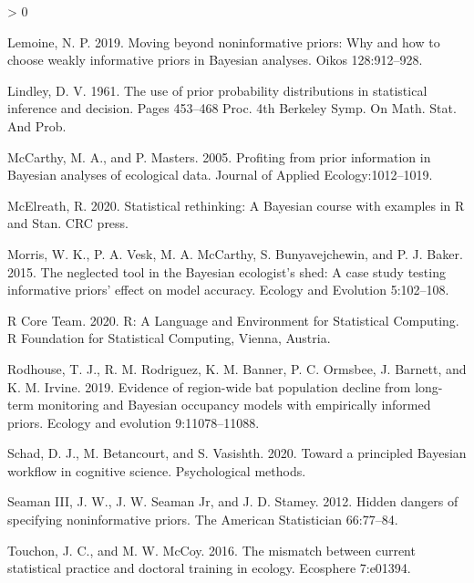 \documentclass[
  12pt,
]{article}
\newlength{\cslhangindent}
\newenvironment{CSLReferences}[2] %
 {%
  \setlength{\parindent}{0pt}
  \ifodd #1 \everypar{\setlength{\hangindent}{\cslhangindent}}\ignorespaces\fi
  \ifnum #2 > 0
  \setlength{\parskip}{#2\baselineskip}
  \fi
 }%
 {}
\begin{document}
\begin{CSLReferences}{1}{0}
\leavevmode\hypertarget{ref-lemoine_moving_2019}{}%
Lemoine, N. P. 2019. Moving beyond noninformative priors: Why and how to
choose weakly informative priors in {Bayesian} analyses. Oikos
128:912--928.

\leavevmode\hypertarget{ref-lindley_use_1961}{}%
Lindley, D. V. 1961. The use of prior probability distributions in
statistical inference and decision. Pages 453--468 Proc. 4th {Berkeley}
{Symp}. On {Math}. {Stat}. And {Prob}.

\leavevmode\hypertarget{ref-mccarthy_profiting_2005}{}%
McCarthy, M. A., and P. Masters. 2005. Profiting from prior information
in {Bayesian} analyses of ecological data. Journal of Applied
Ecology:1012--1019.

\leavevmode\hypertarget{ref-mcelreath_statistical_2020}{}%
McElreath, R. 2020. Statistical rethinking: {A} {Bayesian} course with
examples in {R} and {Stan}. CRC press.

\leavevmode\hypertarget{ref-morris_neglected_2015}{}%
Morris, W. K., P. A. Vesk, M. A. McCarthy, S. Bunyavejchewin, and P. J.
Baker. 2015. The neglected tool in the {Bayesian} ecologist's shed: A
case study testing informative priors' effect on model accuracy. Ecology
and Evolution 5:102--108.

\leavevmode\hypertarget{ref-r_core_team_r_2020}{}%
R Core Team. 2020. R: {A} {Language} and {Environment} for {Statistical}
{Computing}. R Foundation for Statistical Computing, Vienna, Austria.

\leavevmode\hypertarget{ref-rodhouse_evidence_2019}{}%
Rodhouse, T. J., R. M. Rodriguez, K. M. Banner, P. C. Ormsbee, J.
Barnett, and K. M. Irvine. 2019. Evidence of region-wide bat population
decline from long-term monitoring and {Bayesian} occupancy models with
empirically informed priors. Ecology and evolution 9:11078--11088.

\leavevmode\hypertarget{ref-schad_toward_2020}{}%
Schad, D. J., M. Betancourt, and S. Vasishth. 2020. Toward a principled
{Bayesian} workflow in cognitive science. Psychological methods.

\leavevmode\hypertarget{ref-seaman_iii_hidden_2012}{}%
Seaman III, J. W., J. W. Seaman Jr, and J. D. Stamey. 2012. Hidden
dangers of specifying noninformative priors. The American Statistician
66:77--84.

\leavevmode\hypertarget{ref-touchon_mismatch_2016}{}%
Touchon, J. C., and M. W. McCoy. 2016. The mismatch between current
statistical practice and doctoral training in ecology. Ecosphere
7:e01394.


\end{CSLReferences}
\end{document}
